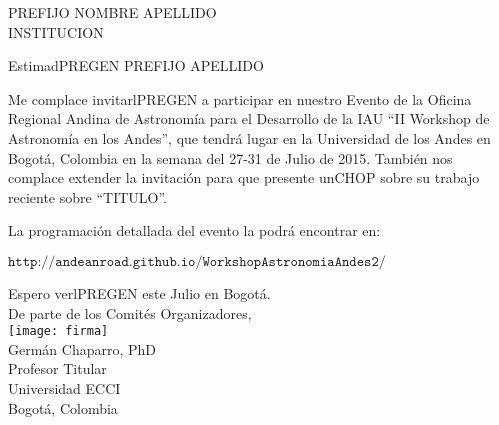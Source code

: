\documentclass[
	pagenumber=false, %
	parskip=half, %
	fromalign=right, %
	foldmarks=false, %
	addrfield=true %
	]{scrlttr2}
\date{Junio 22 de 2015} %
\begin{document}
 
\begin{letter}{PREFIJO NOMBRE APELLIDO\\INSTITUCION\\} %




\opening{EstimadPREGEN PREFIJO APELLIDO}



Me complace invitarlPREGEN a participar en nuestro Evento de la Oficina Regional Andina de Astronom\'ia para el Desarrollo de la IAU  ``II Workshop de Astronom\'ia en los Andes'', que tendr\'a lugar en la Universidad de los Andes en Bogot\'a, Colombia en la semana del 27-31 de Julio de 2015. Tambi\'en nos complace extender la invitaci\'on para que presente unCHOP sobre su trabajo reciente sobre ``TITULO''.   

La programaci\'on detallada del evento la podr\'a encontrar en:

  $\texttt{http://andeanroad.github.io/WorkshopAstronomiaAndes2/ }$

Espero verlPREGEN este Julio en Bogot\'a.\\

De parte de los Comit\'es Organizadores,\\

\texttt{[image: firma]}\\
Germ\'an Chaparro, PhD\\Profesor Titular\\Universidad ECCI\\Bogot\'a, Colombia




\end{letter}
 
\end{document}
